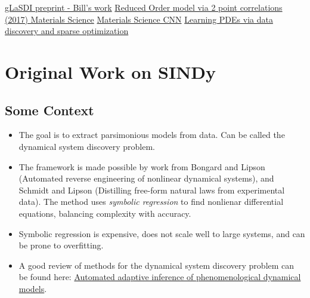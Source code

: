 \documentclass[12pt]{article}
\newcounter{problem}
\begin{document}
    \href{https://arxiv.org/pdf/2204.12005.pdf}{gLaSDI preprint - Bill's work}\newline
    \href{https://reader.elsevier.com/reader/sd/pii/S0021999117304588?token=27B5FCDE852ABD4BCA5D820B055D0B3DB365A6480F33F3B493D751636ED7B3022E5732B63C7EFBE609EC0C218FF980E7&originRegion=us-east-1&originCreation=20220928201508}{Reduced Order model via 2 point correlations (2017) Materials Science}\newline
    \href{https://reader.elsevier.com/reader/sd/pii/S1359645417310443?token=80B58C2FA5BF8E643CE2126B7EBF4EDA518A01E03E388665ADD5D11798BD7AFBACAC75E2DA798D3C67C66F9002B6314B&originRegion=us-east-1&originCreation=20220928201608}{Materials Science CNN}\newline
    \href{https://royalsocietypublishing.org/doi/epdf/10.1098/rspa.2016.0446}{Learning PDEs via data discovery and sparse optimization}

\section{Original Work on SINDy}
\subsection{Some Context}
\begin{itemize}
    \item The goal is to extract parsimonious models from data. Can be called the dynamical system discovery problem.
    \item The framework is made possible by work from Bongard and Lipson (Automated reverse engineering of nonlinear dynamical systems), and Schmidt and Lipson (Distilling free-form natural laws from experimental data). The method uses \emph{symbolic regression} to find nonlienar differential equations, balancing complexity with accuracy.
    \item Symbolic regression is expensive, does not scale well to large systems, and can be prone to overfitting. 
    \item A good review of methods for the dynamical system discovery problem can be found here: \href{https://www.nature.com/articles/ncomms9133.pdf}{Automated adaptive inference of phenomenological dynamical models}.
\end{itemize}
\end{document}

